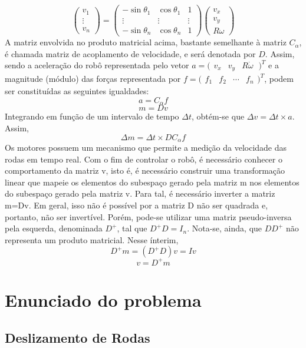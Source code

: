 \documentclass{article}
\begin{document}
\[
\begin{pmatrix}v_{1}\\ \vdots \\ v_{n} \end{pmatrix}
=
\begin{pmatrix}
  -\sin\theta_1 & \cos\theta_1  & 1 \\
  \vdots & \vdots & \vdots  \\
  -\sin\theta_n & \cos\theta_n  & 1
 \end{pmatrix}
\begin{pmatrix}v_{x}\\ v_y \\ R\omega \end{pmatrix}
\]
A matriz envolvida no produto matricial acima, bastante semelhante à matriz $C_\alpha$, é chamada matriz de acoplamento de velocidade, e será denotada por $D$.
Assim, sendo a aceleração do robô representada pelo vetor $a=\bigl(\begin{smallmatrix}v_{x}&v_{y}&R\dot{\omega}\ \end{smallmatrix})^T$ e a magnitude (módulo) das forças representada por $f=\bigl(\begin{smallmatrix}f_{1}&f_{2}&\cdots&f_{n} \end{smallmatrix})^T$, podem ser constituídas as seguintes igualdades:
\[a=C_{\alpha}f\]
\[m=Dv\]
Integrando em função de um intervalo de tempo $\Delta t$, obtém-se que $\Delta v=\Delta t \times a$. Assim,
\[\Delta m=\Delta t\times DC_{\alpha}f\]
Os motores possuem um mecanismo que permite a medição da velocidade das rodas em tempo real. Com o fim de controlar o robô, é necessário conhecer o comportamento da matriz v, isto é, é necessário construir uma transformação linear que mapeie os elementos do subespaço gerado pela matriz m nos elementos do subespaço gerado pela matriz v.
Para tal, é necessário inverter a matriz m=Dv. Em geral, isso não é possível por a matriz D não ser quadrada e, portanto, não ser invertível. Porém, pode-se utilizar uma matriz pseudo-inversa pela esquerda, denominada $D^+$, tal que $D^+ D=I_n$. Nota-se, ainda, que $DD^+$ não representa um produto matricial. Nesse ínterim, 
\[D^+m=(D^+D)v=Iv\]
\[v=D^+m\]



\section{Enunciado do problema}
\subsection{Deslizamento de Rodas}
\end{document}
